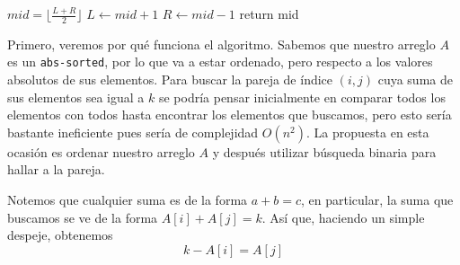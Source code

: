 \documentclass[letterpaper,11pt]{article}
\begin{document}
\begin{enumerate}
\begin{center}
\begin{minipage}[c]{0.75\textwidth}
\begin{algorithm}[H]
\begin{algorithmic}[1]
                    \State $mid = \lfloor \frac{L + R}{2} \rfloor$
                        \State $L \gets mid + 1$
                    \Else {}
                        \State $R \gets mid -1$
                    \Else 
                        \State return mid 
                    \EndIf
                    \EndIf
                \EndWhile
                
            \end{algorithmic} 
        \end{algorithm}
        \end{minipage}
    \end{center}

    Primero, veremos por qué funciona el algoritmo. Sabemos que nuestro arreglo 
    $A$ es un \texttt{abs-sorted}, por lo que va a estar ordenado, pero
    respecto a los valores absolutos de sus elementos. Para buscar la pareja 
    de índice $(i, j)$ cuya suma de sus elementos sea igual a $k$ se podría 
    pensar inicialmente en comparar todos los elementos con todos hasta 
    encontrar los elementos que buscamos, pero esto sería bastante ineficiente 
    pues sería de complejidad $O(n^2)$. La propuesta en esta ocasión es 
    ordenar nuestro arreglo $A$ y después utilizar búsqueda binaria para hallar 
    a la pareja. 

    Notemos que cualquier suma es de la forma $a + b = c$, en particular, la 
    suma que buscamos se ve de la forma $A[i] + A[j] = k$. Así que, haciendo 
    un simple despeje, obtenemos
    \begin{equation*}
        k - A[i] = A[j]
    \end{equation*}


\end{enumerate}
\end{document}
